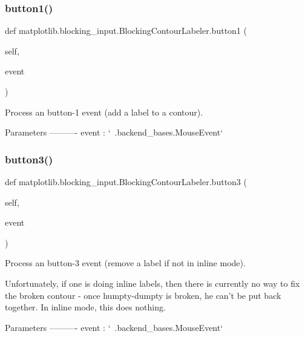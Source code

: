 \subsubsection{\texorpdfstring{button1()}{button1()}}
{\footnotesize\ttfamily def matplotlib.\+blocking\+\_\+input.\+Blocking\+Contour\+Labeler.\+button1 (\begin{DoxyParamCaption}\item[{}]{self,  }\item[{}]{event }\end{DoxyParamCaption})}

\begin{DoxyVerb}Process an button-1 event (add a label to a contour).

Parameters
----------
event : `~.backend_bases.MouseEvent`
\end{DoxyVerb}
 \mbox{\label{classmatplotlib_1_1blocking__input_1_1BlockingContourLabeler_a6678f4e80ead16204389a0b9191c6571}} 
\subsubsection{\texorpdfstring{button3()}{button3()}}
{\footnotesize\ttfamily def matplotlib.\+blocking\+\_\+input.\+Blocking\+Contour\+Labeler.\+button3 (\begin{DoxyParamCaption}\item[{}]{self,  }\item[{}]{event }\end{DoxyParamCaption})}

\begin{DoxyVerb}Process an button-3 event (remove a label if not in inline mode).

Unfortunately, if one is doing inline labels, then there is currently
no way to fix the broken contour - once humpty-dumpty is broken, he
can't be put back together.  In inline mode, this does nothing.

Parameters
----------
event : `~.backend_bases.MouseEvent`
\end{DoxyVerb}
 \mbox{\label{classmatplotlib_1_1blocking__input_1_1BlockingContourLabeler_a989763d45fd5c4c93d7f5dbe2ff42242}} 
